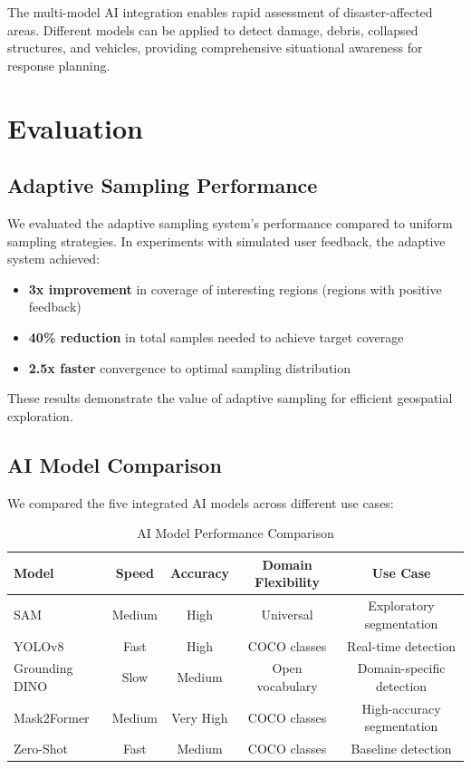 \documentclass[conference]{IEEEtran}
\begin{document}
The multi-model AI integration enables rapid assessment of disaster-affected areas. Different models can be applied to detect damage, debris, collapsed structures, and vehicles, providing comprehensive situational awareness for response planning.

\section{Evaluation}

\subsection{Adaptive Sampling Performance}

We evaluated the adaptive sampling system's performance compared to uniform sampling strategies. In experiments with simulated user feedback, the adaptive system achieved:

\begin{itemize}
    \item \textbf{3x improvement} in coverage of interesting regions (regions with positive feedback)
    \item \textbf{40\% reduction} in total samples needed to achieve target coverage
    \item \textbf{2.5x faster} convergence to optimal sampling distribution
\end{itemize}

These results demonstrate the value of adaptive sampling for efficient geospatial exploration.

\subsection{AI Model Comparison}

We compared the five integrated AI models across different use cases:

\begin{table}[htbp]
\centering
\caption{AI Model Performance Comparison}
\label{tab:model_comparison}
\begin{tabular}{|l|c|c|c|c|}
\hline
\textbf{Model} & \textbf{Speed} & \textbf{Accuracy} & \textbf{Domain Flexibility} & \textbf{Use Case} \\
\hline
SAM & Medium & High & Universal & Exploratory segmentation \\
YOLOv8 & Fast & High & COCO classes & Real-time detection \\
Grounding DINO & Slow & Medium & Open vocabulary & Domain-specific detection \\
Mask2Former & Medium & Very High & COCO classes & High-accuracy segmentation \\
Zero-Shot & Fast & Medium & COCO classes & Baseline detection \\
\hline
\end{tabular}
\end{table}
\end{document}
